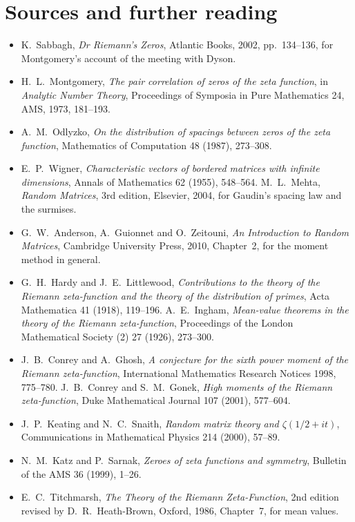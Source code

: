 \section*{Sources and further reading}

\begin{itemize}
\item K.~Sabbagh, \emph{Dr Riemann's Zeros}, Atlantic Books, 2002, pp.~134--136, for Montgomery's account of the meeting with Dyson.
\item H.~L.~Montgomery, \emph{The pair correlation of zeros of the zeta function}, in \emph{Analytic Number Theory}, Proceedings of Symposia in Pure
Mathematics 24, AMS, 1973, 181--193.
\item A.~M.~Odlyzko, \emph{On the distribution of spacings between zeros of the zeta function}, Mathematics of Computation 48 (1987), 273--308.
\item E.~P.~Wigner, \emph{Characteristic vectors of bordered matrices with infinite dimensions}, Annals of Mathematics 62 (1955), 548--564.
M.~L.~Mehta, \emph{Random Matrices}, 3rd edition, Elsevier, 2004, for Gaudin's spacing law and the surmises.
\item G.~W.~Anderson, A.~Guionnet and O.~Zeitouni, \emph{An Introduction to Random Matrices}, Cambridge University Press, 2010, Chapter~2, for the
moment method in general.
\item G.~H.~Hardy and J.~E.~Littlewood, \emph{Contributions to the theory of the Riemann zeta-function and the theory of the distribution of primes},
Acta Mathematica 41 (1918), 119--196. A.~E.~Ingham, \emph{Mean-value theorems in the theory of the Riemann zeta-function}, Proceedings of the London
Mathematical Society (2) 27 (1926), 273--300.
\item J.~B.~Conrey and A.~Ghosh, \emph{A conjecture for the sixth power moment of the Riemann zeta-function}, International Mathematics Research
Notices 1998, 775--780. J.~B.~Conrey and S.~M.~Gonek, \emph{High moments of the Riemann zeta-function}, Duke Mathematical Journal 107 (2001), 577--604.
\item J.~P.~Keating and N.~C.~Snaith, \emph{Random matrix theory and $\zeta(1/2+it)$}, Communications in Mathematical Physics 214 (2000), 57--89.
\item N.~M.~Katz and P.~Sarnak, \emph{Zeroes of zeta functions and symmetry}, Bulletin of the AMS 36 (1999), 1--26.
\item E.~C.~Titchmarsh, \emph{The Theory of the Riemann Zeta-Function}, 2nd edition revised by D.~R.~Heath-Brown, Oxford, 1986, Chapter~7, for mean values.
\end{itemize}
